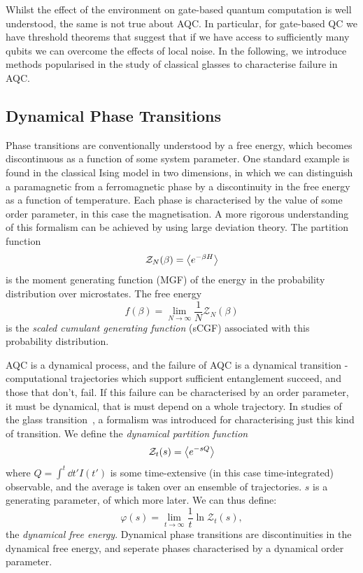 \documentclass{article}
\begin{document}
Whilst the effect of the environment on gate-based quantum computation is well understood, the same is not true about AQC.
In particular, for gate-based QC we have threshold theorems that suggest that if we have access to sufficiently many qubits we can overcome the effects of local noise. 
In the following, we introduce methods popularised in the study of classical glasses to characterise failure in AQC.
\subsection{Dynamical Phase Transitions}
Phase transitions are conventionally understood by a free energy, which becomes discontinuous as a function of some system parameter. 
One standard example is found in the classical Ising model in two dimensions, in which we can distinguish a paramagnetic from a ferromagnetic phase by a discontinuity in the free energy as a function of temperature.
Each phase is characterised by the value of some order parameter, in this case the magnetisation.
A more rigorous understanding of this formalism can be achieved by using large deviation theory. 
The partition function 
\begin{equation}
    \mathcal{Z}_N(\beta) = \ev{e^{-\beta H}}
\end{equation}
is the moment generating function (MGF) of the energy in the probability distribution over microstates.
The free energy 
\begin{equation}
    f(\beta) = \lim_{N\rightarrow\infty} \frac{1}{N} \mathcal{Z}_N(\beta)
\end{equation}
is the \emph{scaled cumulant generating function} (sCGF) associated with this probability distribution.

AQC is a dynamical process, and the failure of AQC is a dynamical transition - computational trajectories which support sufficient entanglement succeed, and those that don't, fail. 
If this failure can be characterised by an order parameter, it must be dynamical, that is must depend on a whole trajectory. 
In studies of the glass transition~\cite{Garrahan2007}, a formalism was introduced for characterising just this kind of transition.
We define the \emph{dynamical partition function}
\begin{equation}
    \mathcal{Z}_t(s) = \ev{e^{-sQ}}\label{eq:mgf}
\end{equation}
where $Q = \int^t \dd{t'} I(t')$ is some time-extensive (in this case time-integrated) observable, and the average is taken over an ensemble of trajectories.
$s$ is a generating parameter, of which more later.
We can thus define:
\begin{equation}
    \varphi(s) = \lim_{t\rightarrow\infty} \frac{1}{t} \ln\mathcal{Z}_t(s), \label{eq:cgf}
\end{equation}
the \emph{dynamical free energy}.
Dynamical phase transitions are discontinuities in the dynamical free energy, and seperate phases characterised by a dynamical order parameter.
%
\end{document}
